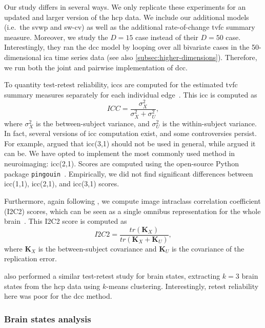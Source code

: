 Our study differs in several ways.
We only replicate these experiments for an updated and larger version of the \gls{hcp} data.
We include our additional models (i.e.~the \gls{svwp} and \gls{sw-cv}) as well as the additional rate-of-change \gls{tvfc} summary measure.
Moreover, we study the $D = 15$ case instead of their $D = 50$ case.
Interestingly, they ran the \gls{dcc} model by looping over all bivariate cases in the 50-dimensional \gls{ica} time series data (see also \cref{subsec:higher-dimensions}).
Therefore, we run both the joint and pairwise implementation of \gls{dcc}.

To quantity test-retest reliability, \glspl{icc} are computed for the estimated \gls{tvfc} summary measures separately for each individual edge~\parencite{Shrout1979, Chen2018}.
This \gls{icc} is computed as
\begin{equation}
  ICC = \frac{\sigma_X^2}{\sigma_X^2 + \sigma_U^2},
  \label{eq:icc}
\end{equation}
where $\sigma_X^2$ is the between-subject variance, and $\sigma_U^2$ is the within-subject variance.
%
In fact, several versions of \gls{icc} computation exist, and some controversies persist.
For example, \textcite{Noble2019} argued that \gls{icc}(3,1) should not be used in general, while \textcite{Chen2018} argued it can be.
We have opted to implement the most commonly used method in neuroimaging: \gls{icc}(2,1).
Scores are computed using the open-source Python package \texttt{pingouin}~\parencite[][version 0.5.3]{Vallat2018}.
Empirically, we did not find significant differences between \gls{icc}(1,1), \gls{icc}(2,1), and \gls{icc}(3,1) scores.

Furthermore, again following \textcite{Choe2017}, we compute image intraclass correlation coefficient (I2C2) scores, which can be seen as a single omnibus representation for the whole brain~\parencite{Shou2013}.
This I2C2 score is computed as
\begin{equation}
  I2C2 = \frac{tr(\mathbf{K}_X)}{tr(\mathbf{K}_X + \mathbf{K}_U)},
  \label{eq:i2c2}
\end{equation}
where $\mathbf{K}_X$ is the between-subject covariance and $\mathbf{K}_U$ is the covariance of the replication error.

\textcite{Choe2017} also performed a similar test-retest study for brain states, extracting $k = 3$ brain states from the \gls{hcp} data using $k$-means clustering.
Interestingly, retest reliability here was poor for the \gls{dcc} method.

\subsubsection{Brain states analysis}

